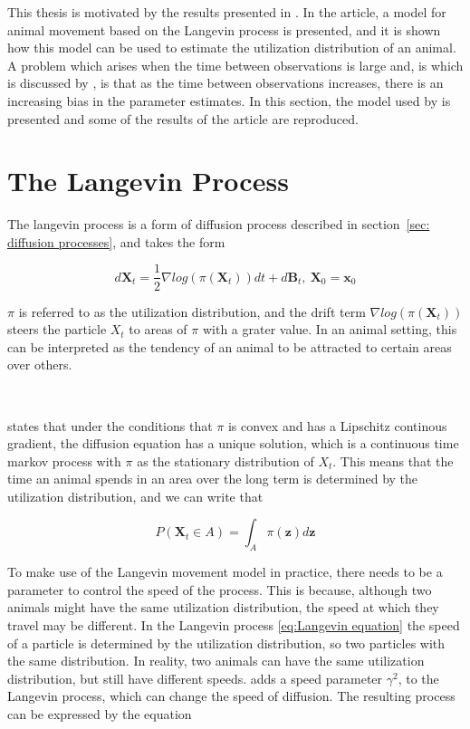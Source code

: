 
\parencite{michelot_langevin_2019}


This thesis is motivated by the results presented in \parencite{michelot_langevin_2019}. In the article, a model for animal movement based on the Langevin process is presented, and it is shown how this model can be used to estimate the utilization distribution of an animal. A problem which arises when the time between observations is large and, is which is discussed by \parencite{michelot_langevin_2019}, is that as the time between observations increases, there is an increasing bias in the parameter estimates. In this section, the model used by \parencite{michelot_langevin_2019} is presented and some of the results of the article are reproduced.



\section{The Langevin Process}
The langevin process is a form of diffusion process described in section~\ref{sec: diffusion processes}, and takes the form

\begin{equation}
    d\textbf{X}_t = \frac{1}{2} \nabla log(\pi(\textbf{X}_t))dt + d\textbf{B}_t, \ \textbf{X}_0 = \textbf{x}_0
    \label{eq:Langevin equation}
\end{equation}


$\pi$ is referred to as the utilization distribution, and the drift term $\nabla log(\pi(\textbf{X}_t))$ steers the particle $X_t$ to areas of $\pi$ with a grater value. In an animal setting, this can be interpreted as the tendency of an animal to be attracted to certain areas over others.

\

\parencite{dalalyan_theoretical_2017} states that under the conditions that $\pi$ is convex and has a Lipschitz continous gradient, the diffusion equation has a unique solution, which is a continuous time markov process with $\pi$ as the stationary distribution of $X_t$. This means that the time an animal spends in an area over the long term is determined by the utilization distribution, and we can write that

\begin{equation}
    P(\textbf{X}_t \in A ) = \int_A \pi(\textbf{z})d\textbf{z}
\end{equation}


To make use of the Langevin movement model in practice, there needs to be a parameter to control the speed of the process. This is because, although two animals might have the same utilization distribution, the speed at which they travel may be different. In the Langevin process \eqref{eq:Langevin equation} the speed of a particle is determined by the utilization distribution, so two particles with the same distribution. In reality, two animals can have the same utilization distribution, but still have different speeds. \parencite{roberts_optimal_1998} adds a speed parameter $\gamma^2$, to the Langevin process, which can change the speed of diffusion. The resulting process can be expressed by the equation

